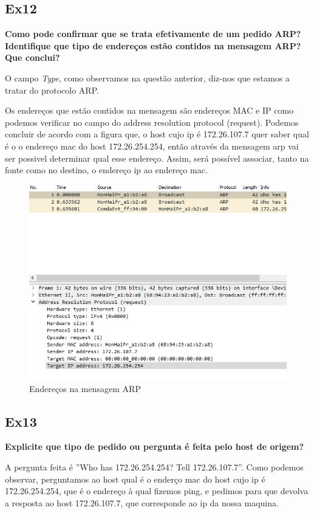 \documentclass{article}
\begin{document}
\subsection{Ex12}
\textbf{Como pode confirmar que se trata efetivamente de um pedido ARP? Identifique que tipo de endereços estão contidos na mensagem ARP? Que conclui?}\\\par
O campo \textit{Type}, como observamos na questão anterior, diz-nos que estamos a tratar do protocolo ARP.\par
Os endereços que estão contidos na mensagem são endereços MAC e IP como podemos verificar no campo do address resolution protocol (request).
Podemos concluir de acordo com a figura que, o host cujo ip é 172.26.107.7 quer saber qual é o o endereço mac do host 172.26.254.254, então através da mensagem arp vai ser possivel determinar qual esse endereço. Assim, será possível associar, tanto na fonte como no destino, o endereço ip ao endereço mac.

\begin{figure}[h]
	\centering
	\includegraphics[scale = 0.5]{ex12.PNG}
	\caption{Endereços na mensagem ARP}
\end{figure}

\subsection{Ex13}
\textbf{Explicite que tipo de pedido ou pergunta é feita pelo host de origem?}\\\par
A pergunta feita é ''Who has 172.26.254.254? Tell 172.26.107.7''. Como podemos observar, perguntamos ao host qual é o enderço mac do host cujo ip é 172.26.254.254, que é o endereço à qual fizemos ping, e pedimos para que devolva a resposta ao host 172.26.107.7, que corresponde ao ip da nossa maquina.
\end{document}
